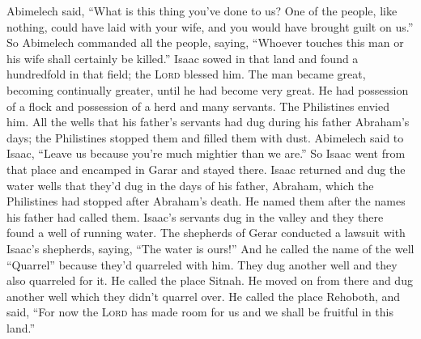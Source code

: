 \begin{inparaenum}
     Abimelech said, ``What is this thing you've done to us? One of the people, like nothing, could have laid with your wife, and you would have brought guilt on us.''%
     So Abimelech commanded all the people, saying, ``Whoever touches this man or his wife shall certainly be killed.''%
     Isaac sowed in that land and found a hundredfold in that field; the \textsc{Lord} blessed him.%
     The man became great, becoming continually greater, until he had become very great.%
     He had possession of a flock and possession of a herd and many servants. The Philistines envied him.%
     All the wells that his father's servants had dug during his father Abraham's days; the Philistines stopped them and filled them with dust.%
     Abimelech said to Isaac, ``Leave us because you're much mightier than we are.''%
     So Isaac went from that place and encamped in Garar and stayed there.%
     Isaac returned and dug the water wells that they'd dug in the days of his father, Abraham, which the Philistines had stopped after Abraham's death. He named them after the names his father had called them.%
     Isaac's servants dug in the valley and they there found a well of running water.%
     The shepherds of Gerar conducted a lawsuit with Isaac's shepherds, saying, ``The water is ours!'' And he called the name of the well ``Quarrel'' because they'd quarreled with him.%
     They dug another well and they also quarreled for it. He called the place Sitnah.%
     He moved on from there and dug another well which they didn't quarrel over. He called the place Rehoboth, and said, ``For now the \textsc{Lord} has made room for us and we shall be fruitful in this land.''%

\end{inparaenum}
